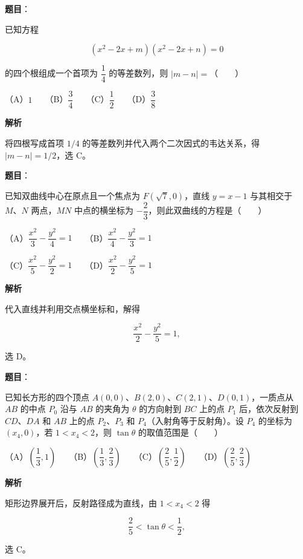 \begin{answer}

\textbf{题目}：

已知方程

\nopagebreak[4]
\[
(x^2-2x+m)(x^2-2x+n)=0
\]

的四个根组成一个首项为 $\dfrac14$ 的等差数列，则 $|m-n|=$\mbox{（　　）}

（A）$1$　　（B）$\dfrac34$　　（C）$\dfrac12$　　（D）$\dfrac38$

\textbf{解析}

将四根写成首项 $1/4$ 的等差数列并代入两个二次因式的韦达关系，得 $|m-n|=1/2$，选 C。


\end{answer}
\begin{answer}

\textbf{题目}：

已知双曲线中心在原点且一个焦点为 $F(\sqrt7,0)$，直线 $y=x-1$ 与其相交于 $M\text{、}N$ 两点，$MN$ 中点的横坐标为 $-\dfrac23$，则此双曲线的方程是\mbox{（　　）}

（A）$\dfrac{x^2}{3}-\dfrac{y^2}{4}=1$　　（B）$\dfrac{x^2}{4}-\dfrac{y^2}{3}=1$

（C）$\dfrac{x^2}{5}-\dfrac{y^2}{2}=1$　　（D）$\dfrac{x^2}{2}-\dfrac{y^2}{5}=1$

\textbf{解析}

代入直线并利用交点横坐标和，解得

\nopagebreak[4]
\[
\frac{x^2}{2}-\frac{y^2}{5}=1,
\]

选 D。


\end{answer}
\begin{answer}

\textbf{题目}：

已知长方形的四个顶点 $A(0,0)\text{、}B(2,0)\text{、}C(2,1)\text{、}D(0,1)$，一质点从 $AB$ 的中点 $P_0$ 沿与 $AB$ 的夹角为 $\theta$ 的方向射到 $BC$ 上的点 $P_1$ 后，依次反射到 $CD\text{、}DA$ 和 $AB$ 上的点 $P_2\text{、}P_3$ 和 $P_4$（入射角等于反射角）。设 $P_4$ 的坐标为 $(x_4,0)$，若 $1<x_4<2$，则 $\tan\theta$ 的取值范围是\mbox{（　　）}

（A）$\left(\dfrac13,1\right)$　　（B）$\left(\dfrac13,\dfrac23\right)$　　（C）$\left(\dfrac25,\dfrac12\right)$　　（D）$\left(\dfrac25,\dfrac23\right)$

\textbf{解析}

矩形边界展开后，反射路径成为直线，由 $1<x_4<2$ 得

\nopagebreak[4]
\[
\frac25<\tan\theta<\frac12,
\]

选 C。


\end{answer}
